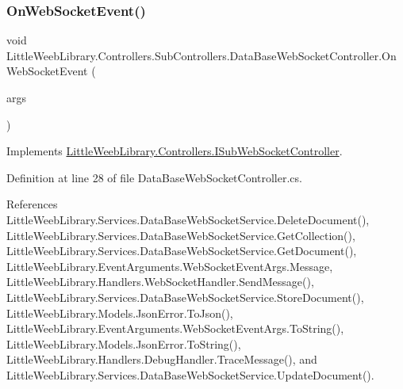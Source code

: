 \subsubsection{\texorpdfstring{On\+Web\+Socket\+Event()}{OnWebSocketEvent()}}
{\footnotesize\ttfamily void Little\+Weeb\+Library.\+Controllers.\+Sub\+Controllers.\+Data\+Base\+Web\+Socket\+Controller.\+On\+Web\+Socket\+Event (\begin{DoxyParamCaption}\item[{\mbox{\hyperlink{class_little_weeb_library_1_1_event_arguments_1_1_web_socket_event_args}{Web\+Socket\+Event\+Args}}}]{args }\end{DoxyParamCaption})}



Implements \mbox{\hyperlink{interface_little_weeb_library_1_1_controllers_1_1_i_sub_web_socket_controller_adcb26b7b397d6a67ccbf114008c29985}{Little\+Weeb\+Library.\+Controllers.\+I\+Sub\+Web\+Socket\+Controller}}.



Definition at line 28 of file Data\+Base\+Web\+Socket\+Controller.\+cs.



References Little\+Weeb\+Library.\+Services.\+Data\+Base\+Web\+Socket\+Service.\+Delete\+Document(), Little\+Weeb\+Library.\+Services.\+Data\+Base\+Web\+Socket\+Service.\+Get\+Collection(), Little\+Weeb\+Library.\+Services.\+Data\+Base\+Web\+Socket\+Service.\+Get\+Document(), Little\+Weeb\+Library.\+Event\+Arguments.\+Web\+Socket\+Event\+Args.\+Message, Little\+Weeb\+Library.\+Handlers.\+Web\+Socket\+Handler.\+Send\+Message(), Little\+Weeb\+Library.\+Services.\+Data\+Base\+Web\+Socket\+Service.\+Store\+Document(), Little\+Weeb\+Library.\+Models.\+Json\+Error.\+To\+Json(), Little\+Weeb\+Library.\+Event\+Arguments.\+Web\+Socket\+Event\+Args.\+To\+String(), Little\+Weeb\+Library.\+Models.\+Json\+Error.\+To\+String(), Little\+Weeb\+Library.\+Handlers.\+Debug\+Handler.\+Trace\+Message(), and Little\+Weeb\+Library.\+Services.\+Data\+Base\+Web\+Socket\+Service.\+Update\+Document().



